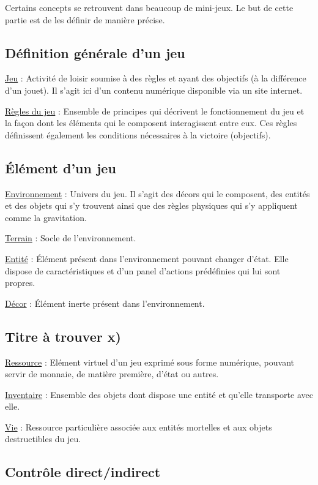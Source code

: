 Certains concepts se retrouvent dans beaucoup de mini-jeux. Le but de cette partie est de les définir de manière précise.

\subsection*{Définition générale d'un jeu}

\underline{Jeu} : 
Activité de loisir soumise à des règles et ayant des objectifs (à la différence d'un jouet). Il s'agit ici d'un contenu numérique
 disponible via un site internet.

\underline{Règles du jeu} : 
Ensemble de principes qui décrivent le fonctionnement du jeu et 
la façon dont les éléments qui le composent interagissent entre eux. 
Ces règles définissent également les conditions nécessaires à la victoire (objectifs).

\subsection*{Élément d'un jeu}

\underline{Environnement} : 
Univers du jeu. Il s'agit des décors qui le composent, des entités et des objets qui s'y trouvent ainsi que 
des règles physiques qui s'y appliquent comme la gravitation.

\underline{Terrain} : 
Socle de l'environnement.

\underline{Entité} : 
Élément présent dans l'environnement pouvant changer d'état. 
Elle dispose de caractéristiques et d'un panel d'actions prédéfinies qui lui sont propres.

\underline{Décor} : 
Élément inerte présent dans l'environnement.


\subsection*{Titre à trouver x)}

\underline{Ressource} : 
Elément virtuel d'un jeu exprimé sous forme numérique, pouvant servir de monnaie, de matière première, d'état ou autres.

\underline{Inventaire} : 
Ensemble des objets dont dispose une entité et qu'elle transporte avec elle.

\underline{Vie} : 
Ressource particulière associée aux entités mortelles et aux objets destructibles du jeu.


\subsection*{Contrôle direct/indirect}


